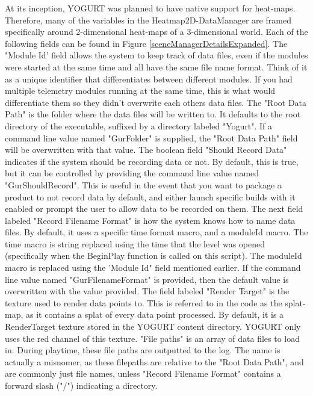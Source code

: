 \documentclass[journal]{IEEEtran}
\begin{document}
At its inception, YOGURT was planned to have native support for heat-maps. Therefore, many of the variables in the Heatmap2D-DataManager are framed specifically around 2-dimensional heat-maps of a 3-dimensional world. Each of the following fields can be found in Figure \ref{sceneManagerDetailsExpanded}.
The "Module Id' field allows the system to keep track of data files, even if the modules were started at the same time and all have the same file name format. Think of it as a unique identifier that differentiates between different modules. If you had multiple telemetry modules running at the same time, this is what would differentiate them so they didn't overwrite each others data files. The "Root Data Path" is the folder where the data files will be written to. It defaults to the root directory of the executable, suffixed by a directory labeled "Yogurt". If a command line value named "GurFolder" is supplied, the "Root Data Path" field will be overwritten with that value.
The boolean field "Should Record Data" indicates if the system should be recording data or not. By default, this is true, but it can be controlled by providing the command line value named "GurShouldRecord". This is useful in the event that you want to package a product to not record data by default, and either launch specific builds with it enabled or prompt the user to allow data to be recorded on them. The next field labeled "Record Filename Format" is how the system knows how to name data files. By default, it uses a specific time format macro, and a moduleId macro. The time macro is string replaced using the time that the level was opened (specifically when the BeginPlay function is called on this script). The moduleId macro is replaced using the 'Module Id" field mentioned earlier. If the command line value named "GurFilenameFormat" is provided, then the default value is overwritten with the value provided.
The field labeled "Render Target" is the texture used to render data points to. This is referred to in the code as the splat-map, as it contains a splat of every data point processed. By default, it is a RenderTarget texture stored in the YOGURT content directory. YOGURT only uses the red channel of this texture. "File paths" is an array of data files to load in. During playtime, these file paths are outputted to the log. The name is actually a misnomer, as these filepaths are relative to the "Root Data Path", and are commonly just file names, unless "Record Filename Format" contains a forward slash ("/") indicating a directory.
\end{document}
